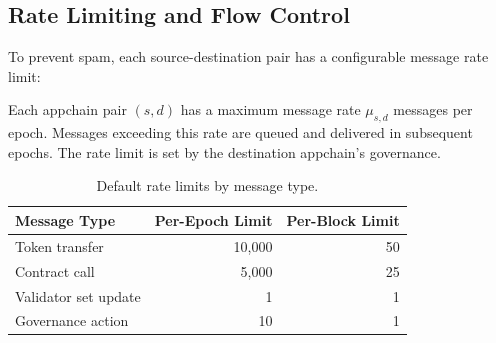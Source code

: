 \subsection{Rate Limiting and Flow Control}

To prevent spam, each source-destination pair has a configurable message rate limit:

\begin{definition}
Each appchain pair $(s, d)$ has a maximum message rate $\mu_{s,d}$ messages per epoch. Messages exceeding this rate are queued and delivered in subsequent epochs. The rate limit is set by the destination appchain's governance.
\end{definition}

\begin{table}[H]
\centering
\caption{Default rate limits by message type.}
\label{tab:ratelimits}
\begin{tabular}{lrr}
\toprule
\textbf{Message Type} & \textbf{Per-Epoch Limit} & \textbf{Per-Block Limit} \\
\midrule
Token transfer & 10,000 & 50 \\
Contract call & 5,000 & 25 \\
Validator set update & 1 & 1 \\
Governance action & 10 & 1 \\
\bottomrule
\end{tabular}
\end{table}

